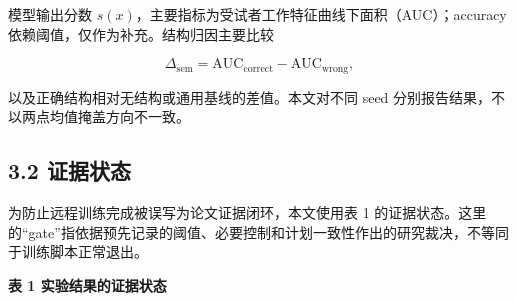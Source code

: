 \documentclass[
  a4paper,
  UTF8]{ctexart}
\begin{document}
模型输出分数
\(s(x)\)，主要指标为受试者工作特征曲线下面积（AUC）；accuracy
依赖阈值，仅作为补充。结构归因主要比较

\[
\Delta_{\mathrm{sem}}=\mathrm{AUC}_{\mathrm{correct}}-\mathrm{AUC}_{\mathrm{wrong}},
\]

以及正确结构相对无结构或通用基线的差值。本文对不同 seed
分别报告结果，不以两点均值掩盖方向不一致。

\hypertarget{ux8bc1ux636eux72b6ux6001}{%
\subsection{3.2 证据状态}\label{ux8bc1ux636eux72b6ux6001}}

为防止远程训练完成被误写为论文证据闭环，本文使用表 1
的证据状态。这里的``gate''指依据预先记录的阈值、必要控制和计划一致性作出的研究裁决，不等同于训练脚本正常退出。

\textbf{表 1 实验结果的证据状态}
\end{document}
